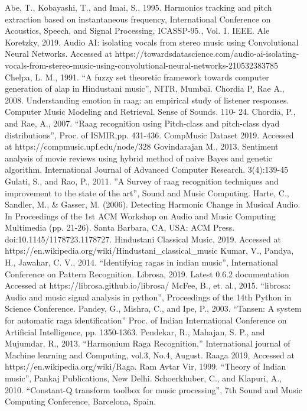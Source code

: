 \doublespacing
\setlength{\parindent}{1cm}

Abe, T., Kobayashi, T., and Imai, S., 1995. Harmonics tracking and pitch extraction based on instantaneous frequency, International Conference on Acoustics, Speech, and Signal Processing, ICASSP-95., Vol. 1. IEEE.
Ale Koretzky, 2019. Audio AI: isolating vocals from stereo music using Convolutional Neural Networks. Accessed at https://towardsdatascience.com/audio-ai-isolating-vocals-from-stereo-music-using-convolutional-neural-networks-210532383785
Chelpa, L. M., 1991. “A fuzzy set theoretic framework towards computer generation of alap in Hindustani music”, NITR, Mumbai.
Chordia P, Rae A., 2008. Understanding emotion in raag: an empirical study of listener responses. Computer Music Modeling and Retrieval. Sense of Sounds. 110- 24.
Chordia, P., and Rae, A., 2007. “Raag recognition using Pitch-class and pitch-class dyad distributions”, Proc. of ISMIR,pp. 431-436.
CompMusic Dataset 2019. Accessed at https://compmusic.upf.edu/node/328
Govindarajan M., 2013. Sentiment analysis of movie reviews using hybrid method of naive Bayes and genetic algorithm. International Journal of Advanced Computer Research. 3(4):139-45
Gulati, S., and Rao, P., 2011. ”A Survey of raag recognition techniques and improvement to the state of the art”, Sound and Music Computing.
Harte, C., Sandler, M., \& Gasser, M. (2006). Detecting Harmonic Change in Musical Audio. In Proceedings of the 1st ACM Workshop on Audio and Music Computing Multimedia (pp. 21-26). Santa Barbara, CA, USA: ACM Press. doi:10.1145/1178723.1178727.
Hindustani Classical Music, 2019. Accessed at https://en.wikipedia.org/wiki/Hindustani_classical_music
Kumar, V., Pandya, H., Jawahar, C. V., 2014. ``Identifying ragas in indian music'', International Conference on Pattern Recognition.
Librosa, 2019. Latest 0.6.2 documentation Accessed at https://librosa.github.io/librosa/
McFee, B., et. al., 2015. ``librosa: Audio and music signal analysis in python'', Proceedings of the 14th Python in Science Conference.
Pandey, G., Mishra, C., and Ipe, P., 2003. “Tansen: A system for automatic raga identification” Proc. of Indian International Conference on Artificial Intelligence, pp. 1350-1363.
Pendekar, R., Mahajan, S. P., and Mujumdar, R., 2013. “Harmonium Raga Recognition,” International journal of Machine learning and Computing, vol.3, No.4, August.
Raaga 2019, Accessed at https://en.wikipedia.org/wiki/Raga.
Ram Avtar Vir, 1999. “Theory of Indian music”, Pankaj Publications, New Delhi.
Schoerkhuber, C., and Klapuri, A., 2010. “Constant-Q transform toolbox for music processing”, 7th Sound and Music Computing Conference, Barcelona, Spain.

